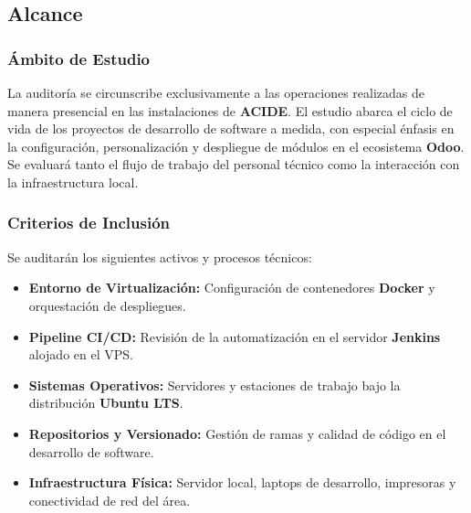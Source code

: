 \documentclass[12pt]{article}
\begin{document}
\subsection{Alcance}

\subsubsection{Ámbito de Estudio}
La auditoría se circunscribe exclusivamente a las operaciones realizadas de manera presencial en las instalaciones de \textbf{ACIDE}. El estudio abarca el ciclo de vida de los proyectos de desarrollo de software a medida, con especial énfasis en la configuración, personalización y despliegue de módulos en el ecosistema \textbf{Odoo}. Se evaluará tanto el flujo de trabajo del personal técnico como la interacción con la infraestructura local.

\subsubsection{Criterios de Inclusión}
Se auditarán los siguientes activos y procesos técnicos:
\begin{itemize}
    \item \textbf{Entorno de Virtualización:} Configuración de contenedores \textbf{Docker} y orquestación de despliegues.
    \item \textbf{Pipeline CI/CD:} Revisión de la automatización en el servidor \textbf{Jenkins} alojado en el VPS.
    \item \textbf{Sistemas Operativos:} Servidores y estaciones de trabajo bajo la distribución \textbf{Ubuntu LTS}.
    \item \textbf{Repositorios y Versionado:} Gestión de ramas y calidad de código en el desarrollo de software.
    \item \textbf{Infraestructura Física:} Servidor local, laptops de desarrollo, impresoras y conectividad de red del área.
\end{itemize}
\end{document}
